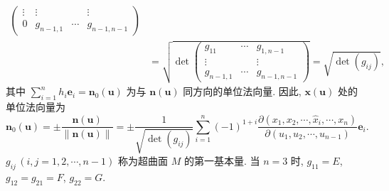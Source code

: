 \begin{example}
\begin{align*}
{\begin{pmatrix}
    \vdots & \vdots & & \vdots \\
    0 & g_{n-1,1} & \cdots & g_{n-1,n-1}
  \end{pmatrix}} \\
  &= \sqrt{\det\begin{pmatrix}
    g_{11} & \cdots & g_{1,n-1} \\
    \vdots & & \vdots \\
    g_{n-1,1} & \cdots & g_{n-1,n-1}
  \end{pmatrix}} = \sqrt{\det(g_{ij})},
\end{align*}
其中 $\sum_{i=1}^{n}h_{i}\boldsymbol{e}_{i} = \boldsymbol{n}_{0}(\boldsymbol{u})$ 为与 $\boldsymbol{n}(\boldsymbol{u})$ 同方向的单位法向量. 因此, $\boldsymbol{x}(\boldsymbol{u})$ 处的单位法向量为
\[
  \boldsymbol{n}_{0}(\boldsymbol{u}) = \pm\frac{\boldsymbol{n}(\boldsymbol{u})}{\|\boldsymbol{n}(\boldsymbol{u})\|} = \pm\frac{1}{\sqrt{\det(g_{ij})}}\sum_{i=1}^{n}(-1)^{1+i}\frac{\partial(x_{1}, x_{2}, \cdots, \hat{x}_{i}, \cdots, x_{n})}{\partial(u_{1}, u_{2}, \cdots, u_{n-1})}\boldsymbol{e}_{i}.
\]
$g_{ij}\,(i, j = 1, 2, \cdots, n - 1)$ 称为超曲面 $M$ 的第一基本量. 当 $n = 3$ 时, $g_{11} = E$, $g_{12} = g_{21} = F$, $g_{22} = G$.


\end{example}
